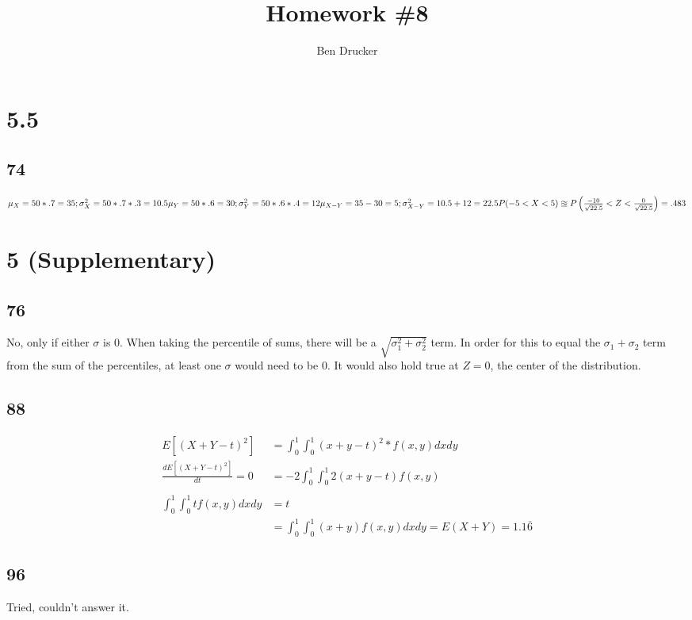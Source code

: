 \documentclass{article}
\newcommand{\hwkNum}{8}
\newcommand{\hwkAuthors}{Ben Drucker}
\begin{document}
\title{Homework \#\hwkNum}
\author{\hwkAuthors}
\date{}

\maketitle


\section*{5.5}
	\subsection*{74}
		$\mu_X = 50*.7 = 35; \sigma_X^2 = 50*.7*.3 = 10.5\\
		\mu_Y = 50*.6 = 30; \sigma_Y^2 = 50*.6*.4 = 12 \\
		\mu_{X-Y} = 35 - 30 =5; \sigma_{X-Y}^2 = 10.5+12 = 22.5\\
		P(-5 < X < 5) \approxeq P \left ( \frac{-10}{\sqrt {22.5}} < Z < \frac{0}{\sqrt{22.5}} \right ) = .483$
		
\section*{5 (Supplementary)}
	\subsection*{76}
		No, only if either $\sigma$ is 0. When taking the percentile of sums, there will be a $\sqrt{\sigma_1^2 + \sigma_2^2}$ term. In order for this to equal the $\sigma_1 + \sigma_2$ term from the sum of the percentiles, at least one $\sigma$ would need to be 0. It would also hold true at $ Z=0$, the center of the distribution.
	\subsection*{88}
		\begin{align*}
			E \left [(X+Y-t)^2 \right ] &= \int_0^1 \int_0^1 (x+y-t)^2 * f(x,y)dxdy\\
			\frac{dE \left [(X+Y-t)^2 \right ]}{dt} = 0 &= -2 \int_0^1 \int_0^1 2(x+y-t)f(x,y)	\\ \\ 
			\int_0^1 \int_0^1 tf(x,y)dxdy &=t \\
			&= \int_0^1 \int_0^1 (x+y)f(x,y)dxdy = E(X+Y) = 1.1\overline{6}	
		\end{align*}							
	\subsection*{96}
		Tried, couldn't answer it. 
\end{document}
